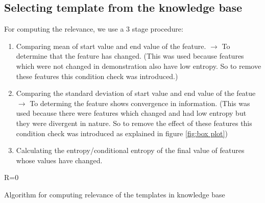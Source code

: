 \subsection{Selecting template from the knowledge base}
For computing the relevance, we use a 3 stage procedure:
\begin{enumerate}
    \item Comparing mean of start value and end value of the feature. $\rightarrow$ To determine that the feature has changed.
            (This was used because features which were not changed in demonstration also have low entropy. So to remove these features this condition 
            check was introduced.)
    \item Comparing the standard deviation of start value and end value of the featue $\rightarrow$ To determing the feature shows convergence in information.
            (This was used because there were features which changed and had low entropy but they were divergent in nature. So to remove the effect of 
            these features this condition check was introduced as explained in figure \ref{fig:box plot})
    \item Calculating the entropy/conditional entropy of the final value of features whose values have changed.
\end{enumerate}

\begin{algorithm}[H]
 R=0\;
 \caption{Algorithm for computing relevance of the templates in knowledge base}
\end{algorithm}

